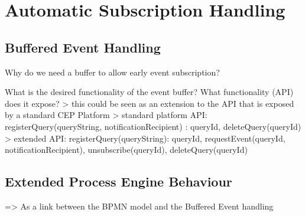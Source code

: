 \chapter{Automatic Subscription Handling}\label{ch:automatic-subscription}

\section{Buffered Event Handling}
Why do we need a buffer to allow early event subscription?

What is the desired functionality of the event buffer? What functionality (API) does it expose?
> this could be seen as an extension to the API that is exposed by a standard CEP Platform
> standard platform API: registerQuery(queryString, notificationRecipient) : queryId, deleteQuery(queryId)
> extended API: registerQuery(queryString): queryId, requestEvent(queryId, notificationRecipient), unsubscribe(queryId), deleteQuery(queryId)




\section{Extended Process Engine Behaviour}
=> As a link between the BPMN model and the Buffered Event handling

